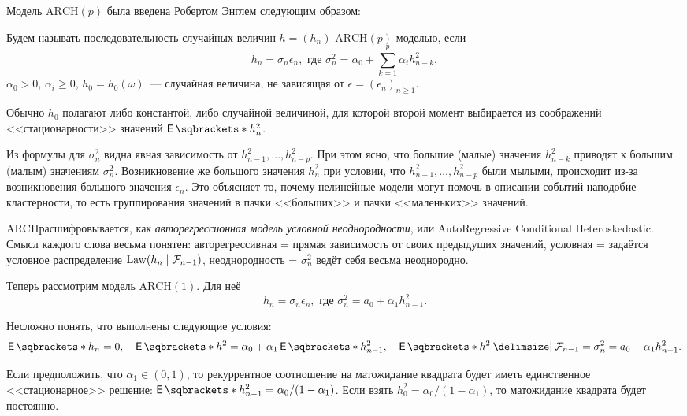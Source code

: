 Модель \(\mathrm{ARCH}(p)\) была введена Робертом Энглем следующим образом:
\begin{definition}
	Будем называть последовательность случайных величин \(h = (h_{n})\) 
	\(\mathrm{ARCH}(p)\)-моделью, если
	\[
		h_{n} = \sigma_{n}\epsilon_{n}, \text{ где } \sigma_{n}^{2} = 
		\alpha_{0} + \sum_{k = 1}^{p}\alpha_{i}h_{n - k}^{2},
	\]
	\(\alpha_{0} > 0\), \(\alpha_{i} \geq 0\), \(h_{0} = h_{0}(\omega)\)~--- 
	случайная величина, не зависящая от \(\epsilon = (\epsilon_{n})_{n \geq 
	1}\).
\end{definition}
Обычно \(h_{0}\) полагают либо константой, либо случайной величиной, для 
которой второй момент выбирается из соображений <<стационарности>> значений 
\(\E{h_{n}^{2}}\).

Из формулы для \(\sigma^{2}_{n}\) видна явная зависимость от \(h_{n - 1}^{2}, 
\ldots, h_{n - p}^{2}\). При этом ясно, что большие (малые) значения \(h_{n - 
k}^{2}\) приводят к большим (малым) значениям \(\sigma_{n}^{2}\). Возникновение 
же большого значения \(h_{n}^{2}\) при условии, что \(h_{n - 1}^{2}, \ldots, 
h_{n - p}^{2}\) были мылыми, происходит из-за возникновения большого значения 
\(\epsilon_{n}\). Это объясняет то, почему нелинейные модели могут помочь в 
описании событий наподобие кластерности, то есть группирования значений в пачки 
<<больших>> и пачки <<маленьких>> значений.

\(\mathrm{ARCH}\)расшифровывается, как \emph{авторегрессионная модель условной 
неоднородности}, или AutoRegressive Conditional Heteroskedastic. Смысл каждого 
слова весьма понятен: авторегрессивная = прямая зависимость от своих предыдущих 
значений, условная = задаётся условное распределение \(\operatorname{Law}(h_{n} \mid \mathcal{F}_{n - 
1})\), неоднородность = \(\sigma_{n}^{2}\) ведёт себя весьма неоднородно.

Теперь рассмотрим модель \(\mathrm{ARCH}(1)\). Для неё
\[
	h_{n} = \sigma_{n}\epsilon_{n}, \text{ где } \sigma_{n}^{2} = a_{0} + 
	\alpha_{1}h_{n - 1}^{2}.
\]

Несложно понять, что выполнены следующие условия:
\[
	\E{h_{n}} = 0, \quad \E{h^{2}} = \alpha_{0} + \alpha_{1}\E{h_{n - 1}^{2}}, 
	\quad \E{h^{2} \given \F_{n - 1}} = \sigma_{n}^{2} = a_{0} + 
	\alpha_{1}h_{n - 1}^{2}.
\]

Если предположить, что \(\alpha_{1} \in (0, 1)\), то рекуррентное соотношение 
на матожидание квадрата будет иметь единственное <<стационарное>> решение: 
\(\E{h_{n - 1}^{2}} = \alpha_{0}/(1 - \alpha_{1})\). Если взять \(h_{0}^{2} = 
\alpha_{0}/(1 - \alpha_{1})\), то матожидание квадрата будет постоянно.

